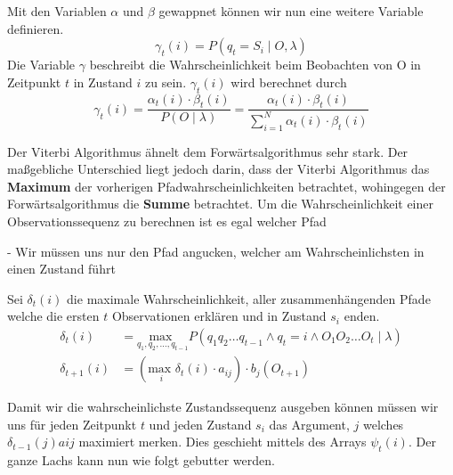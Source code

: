 Mit den Variablen $\alpha$ und $\beta$ gewappnet können wir nun eine weitere Variable definieren.
\begin{equation*}
    \gamma_t(i) = P(q_t = S_i \mid O, \lambda)
\end{equation*}
Die Variable $\gamma$ beschreibt die Wahrscheinlichkeit beim Beobachten von O in Zeitpunkt $t$ in Zustand $i$ zu sein. $\gamma_t(i)$ wird berechnet durch
\begin{equation*}
\gamma_t(i)
= \frac{\alpha_t(i) \cdot \beta_t(i)}{P(O \mid \lambda)}
= \frac{\alpha_t(i) \cdot \beta_t(i)}{\sum_{i=1}^{N} \alpha_t(i) \cdot \beta_t(i)}
\end{equation*}


Der Viterbi Algorithmus ähnelt dem Forwärtsalgorithmus sehr stark. Der maßgebliche Unterschied liegt jedoch darin, dass der Viterbi Algorithmus das \textbf{Maximum} der vorherigen Pfadwahrscheinlichkeiten betrachtet, wohingegen der Forwärtsalgorithmus die \textbf{Summe} betrachtet. Um die Wahrscheinlichkeit einer Observationssequenz zu berechnen ist es egal welcher Pfad 

- Wir müssen uns nur den Pfad angucken, welcher am Wahrscheinlichsten in einen Zustand führt

Sei $\delta_t(i)$ die maximale Wahrscheinlichkeit, aller zusammenhängenden Pfade welche die ersten $t$ Observationen erklären und in Zustand $s_i$ enden.
\begin{align*}
    \delta_t(i) & = \underset{q_1, q_2, \dots, q_{t-1}}{\text{max }} P(q_1 q_2 \dots q_{t-1} \wedge q_t = i \wedge O_1 O_2 \dots O_t \mid \lambda) \\
    \delta_{t+1}(i) & = (\underset{i}{\text{max }} \delta_t(i) \cdot a_{ij}) \cdot b_j(O_{t+1})
\end{align*}

Damit wir die wahrscheinlichste Zustandssequenz ausgeben können müssen wir uns für jeden Zeitpunkt $t$ und jeden Zustand $s_i$ das Argument, $j$ welches $\delta_{t -1}(j)a{ij}$ maximiert merken. Dies geschieht mittels des Arrays $\psi_t(i)$. Der ganze Lachs kann nun wie folgt gebutter werden.

